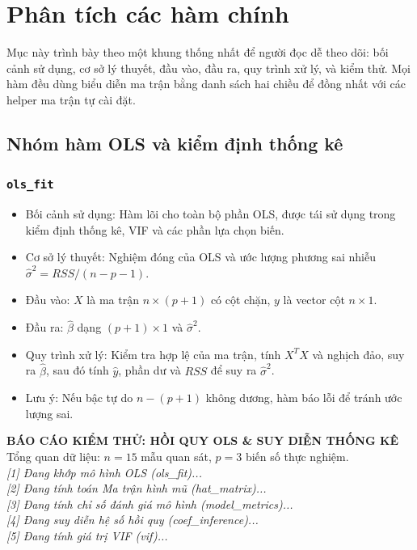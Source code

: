 \documentclass[a4paper]{article}
\newcommand{\code}[1]{\colorbox{light-gray}{\texttt{#1}}}
\begin{document}
\section{Phân tích các hàm chính}

Mục này trình bày theo một khung thống nhất để người đọc dễ theo dõi: bối cảnh sử dụng, cơ sở lý thuyết, đầu vào, đầu ra, quy trình xử lý, và kiểm thử. Mọi hàm đều dùng biểu diễn ma trận bằng danh sách hai chiều để đồng nhất với các helper ma trận tự cài đặt.

\subsection{Nhóm hàm OLS và kiểm định thống kê}

\subsubsection{\texorpdfstring{\code{ols\_fit}}{ols\_fit}}
\begin{itemize}[leftmargin=*]
    \item Bối cảnh sử dụng: Hàm lõi cho toàn bộ phần OLS, được tái sử dụng trong kiểm định thống kê, VIF và các phần lựa chọn biến.
    \item Cơ sở lý thuyết: Nghiệm đóng của OLS và ước lượng phương sai nhiễu $\hat{\sigma}^2 = RSS/(n-p-1)$.
    \item Đầu vào: $X$ là ma trận $n\times(p+1)$ có cột chặn, $y$ là vector cột $n\times1$.
    \item Đầu ra: $\hat{\beta}$ dạng $(p+1)\times1$ và $\hat{\sigma}^2$.
    \item Quy trình xử lý: Kiểm tra hợp lệ của ma trận, tính $X^T X$ và nghịch đảo, suy ra $\hat{\beta}$, sau đó tính $\hat{y}$, phần dư và $RSS$ để suy ra $\hat{\sigma}^2$.
    \item Lưu ý: Nếu bậc tự do $n-(p+1)$ không dương, hàm báo lỗi để tránh ước lượng sai.
\end{itemize}
\begin{mdframed}[backgroundcolor=light-gray, roundcorner=5pt, hidealllines=true]
\textbf{BÁO CÁO KIỂM THỬ: HỒI QUY OLS \& SUY DIỄN THỐNG KÊ} \\
Tổng quan dữ liệu: $n = 15$ mẫu quan sát, $p = 3$ biến số thực nghiệm. \\
\textit{[1] Đang khớp mô hình OLS (ols\_fit)...} \\
\textit{[2] Đang tính toán Ma trận hình mũ (hat\_matrix)...} \\
\textit{[3] Đang tính chỉ số đánh giá mô hình (model\_metrics)...} \\
\textit{[4] Đang suy diễn hệ số hồi quy (coef\_inference)...} \\
\textit{[5] Đang tính giá trị VIF (vif)...}
\end{mdframed}
\end{document}
